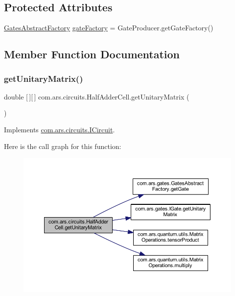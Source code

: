 \subsection*{Protected Attributes}
\begin{DoxyCompactItemize}
\item 
\hyperlink{classcom_1_1ars_1_1gates_1_1_gates_abstract_factory}{Gates\+Abstract\+Factory} \hyperlink{classcom_1_1ars_1_1circuits_1_1_half_adder_cell_a5f7e032657ce1f64a8c735bac276653d}{gate\+Factory} = Gate\+Producer.\+get\+Gate\+Factory()
\end{DoxyCompactItemize}


\subsection{Member Function Documentation}
\hypertarget{classcom_1_1ars_1_1circuits_1_1_half_adder_cell_a540342262612af85393e1c07675fd7e9}{}\label{classcom_1_1ars_1_1circuits_1_1_half_adder_cell_a540342262612af85393e1c07675fd7e9} 
\subsubsection{\texorpdfstring{get\+Unitary\+Matrix()}{getUnitaryMatrix()}}
{\footnotesize\ttfamily double \mbox{[}$\,$\mbox{]}\mbox{[}$\,$\mbox{]} com.\+ars.\+circuits.\+Half\+Adder\+Cell.\+get\+Unitary\+Matrix (\begin{DoxyParamCaption}{ }\end{DoxyParamCaption})}



Implements \hyperlink{interfacecom_1_1ars_1_1circuits_1_1_i_circuit_a83a4a39c153cec6a292572228eaecbbc}{com.\+ars.\+circuits.\+I\+Circuit}.

Here is the call graph for this function\+:
\nopagebreak
\begin{figure}[H]
\begin{center}
\leavevmode
\includegraphics[width=350pt]{classcom_1_1ars_1_1circuits_1_1_half_adder_cell_a540342262612af85393e1c07675fd7e9_cgraph}
\end{center}
\end{figure}


